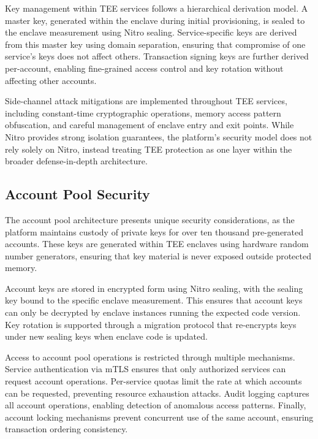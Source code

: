 \documentclass[11pt,a4paper]{article}
\begin{document}
Key management within TEE services follows a hierarchical derivation model. A master key, generated within the enclave during initial provisioning, is sealed to the enclave measurement using Nitro sealing. Service-specific keys are derived from this master key using domain separation, ensuring that compromise of one service's keys does not affect others. Transaction signing keys are further derived per-account, enabling fine-grained access control and key rotation without affecting other accounts.

Side-channel attack mitigations are implemented throughout TEE services, including constant-time cryptographic operations, memory access pattern obfuscation, and careful management of enclave entry and exit points. While Nitro provides strong isolation guarantees, the platform's security model does not rely solely on Nitro, instead treating TEE protection as one layer within the broader defense-in-depth architecture.

\subsection{Account Pool Security}

The account pool architecture presents unique security considerations, as the platform maintains custody of private keys for over ten thousand pre-generated accounts. These keys are generated within TEE enclaves using hardware random number generators, ensuring that key material is never exposed outside protected memory.

Account keys are stored in encrypted form using Nitro sealing, with the sealing key bound to the specific enclave measurement. This ensures that account keys can only be decrypted by enclave instances running the expected code version. Key rotation is supported through a migration protocol that re-encrypts keys under new sealing keys when enclave code is updated.

Access to account pool operations is restricted through multiple mechanisms. Service authentication via mTLS ensures that only authorized services can request account operations. Per-service quotas limit the rate at which accounts can be requested, preventing resource exhaustion attacks. Audit logging captures all account operations, enabling detection of anomalous access patterns. Finally, account locking mechanisms prevent concurrent use of the same account, ensuring transaction ordering consistency.

\newpage
\end{document}
